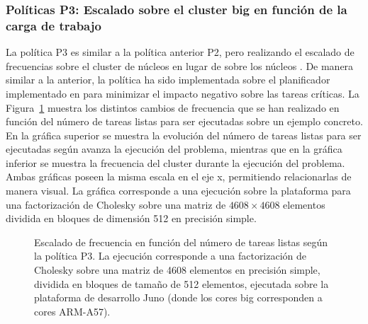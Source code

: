 \subsubsection{Políticas P3: Escalado sobre el cluster big en
  función de la carga de trabajo}

La política P3 es similar a la política anterior P2, pero realizando el
escalado de frecuencias sobre el cluster de núcleos \BIG en lugar de sobre los núcleos
\LITTLE. De manera similar a la anterior, la política ha sido implementada
sobre el planificador \botlev implementado en \ompss para 
minimizar el impacto negativo sobre las tareas críticas. La
Figura~\ref{s5:fig:P3-evo} muestra los distintos cambios de frecuencia que
se han realizado en función del número de tareas listas para ser
ejecutadas sobre un ejemplo concreto. En la gráfica superior se muestra la evolución del número de
tareas listas para ser ejecutadas según avanza la ejecución del problema,
mientras que en la gráfica inferior se muestra la frecuencia del cluster
\BIG durante la ejecución del problema. Ambas gráficas poseen la misma
escala en el eje x, permitiendo relacionarlas de manera visual. La gráfica
corresponde a una ejecución sobre la plataforma \juno para una factorización
de Cholesky sobre una matriz de $4608 \times 4608$ elementos dividida en bloques
de dimensión 512 en precisión simple.


\begin{figure}
  \centering
  {
    \setlength{\fboxsep}{-10pt}
  }
  \caption[Escalado de frecuencia en función del número de tareas listas
  según la política P3]{Escalado de frecuencia en función del número de
    tareas listas según la política P3. La ejecución corresponde a una
    factorización de Cholesky sobre una matriz de 4608 elementos en
    precisión simple, dividida en bloques de tamaño de 512 elementos,
    ejecutada sobre la plataforma de desarrollo Juno (donde los cores big
    corresponden a cores ARM-A57).}
  \label{s5:fig:P3-evo}
\end{figure}


